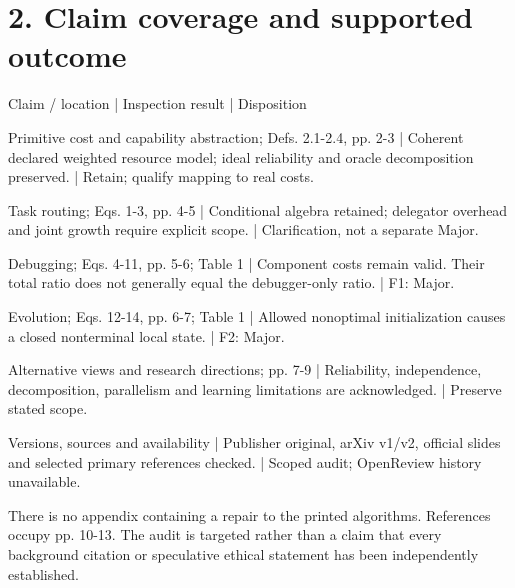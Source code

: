 \documentclass[10pt]{article}
\begin{document}
\section*{2. Claim coverage and supported outcome}
Claim / location | Inspection result | Disposition\par
Primitive cost and capability abstraction; Defs. 2.1-2.4, pp. 2-3 | Coherent declared weighted resource model; ideal reliability and oracle decomposition preserved. | Retain; qualify mapping to real costs.\par
Task routing; Eqs. 1-3, pp. 4-5 | Conditional algebra retained; delegator overhead and joint growth require explicit scope. | Clarification, not a separate Major.\par
Debugging; Eqs. 4-11, pp. 5-6; Table 1 | Component costs remain valid. Their total ratio does not generally equal the debugger-only ratio. | F1: Major.\par
Evolution; Eqs. 12-14, pp. 6-7; Table 1 | Allowed nonoptimal initialization causes a closed nonterminal local state. | F2: Major.\par
Alternative views and research directions; pp. 7-9 | Reliability, independence, decomposition, parallelism and learning limitations are acknowledged. | Preserve stated scope.\par
Versions, sources and availability | Publisher original, arXiv v1/v2, official slides and selected primary references checked. | Scoped audit; OpenReview history unavailable.\par
There is no appendix containing a repair to the printed algorithms. References occupy pp. 10-13. The audit is targeted rather than a claim that every background citation or speculative ethical statement has been independently established.\par
\end{document}
